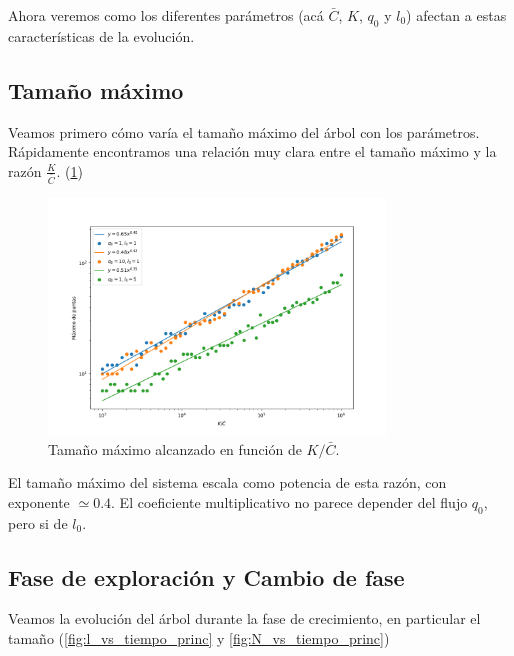 \documentclass{article}
\begin{document}
Ahora veremos como los diferentes parámetros (acá $\bar{C}$, $K$, $q_0$ y $l_0$) afectan a estas características de la evolución.

\subsection{Tamaño máximo}

Veamos primero cómo varía el tamaño máximo del árbol con los parámetros. Rápidamente encontramos una relación muy clara entre el tamaño máximo y la razón $\frac{K}{\bar{C}}$. (\ref{fig:max_vs_KC})
\begin{figure}[h!]
    \centering
    \includegraphics[width=0.8\textwidth]{graficos_inst/max_vs_KC.png}
    \caption{Tamaño máximo alcanzado en función de $K/\bar{C}$.}
    \label{fig:max_vs_KC}
\end{figure}
El tamaño máximo del sistema escala como potencia de esta razón, con exponente $\simeq 0.4$. El coeficiente multiplicativo no parece depender del flujo $q_0$, pero si de $l_0$.

\subsection{Fase de exploración y Cambio de fase}

Veamos la evolución del árbol durante la fase de crecimiento, en particular el tamaño (\ref{fig:l_vs_tiempo_princ} y \ref{fig:N_vs_tiempo_princ})
\end{document}
